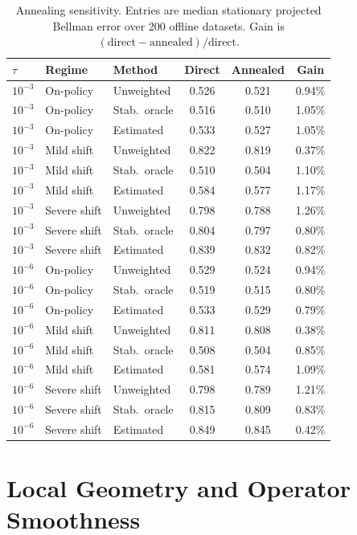 \documentclass{article}
\theoremstyle{plain}
\theoremstyle{definition}
\theoremstyle{remark}
\begin{document}
\begin{table}[h]
\centering
\caption{Annealing sensitivity. Entries are median stationary projected
Bellman error over 200 offline datasets. Gain is
\((\mathrm{direct}-\mathrm{annealed})/\mathrm{direct}\).}
\label{tab:soft-fqi-annealing-sensitivity}
\begin{tabular}{lllccc}
\toprule
\(\tau\) & Regime & Method & Direct & Annealed & Gain \\
\midrule
\(10^{-3}\) & On-policy & Unweighted & 0.526 & 0.521 & 0.94\% \\
\(10^{-3}\) & On-policy & Stab.\ oracle & 0.516 & 0.510 & 1.05\% \\
\(10^{-3}\) & On-policy & Estimated & 0.533 & 0.527 & 1.05\% \\
\(10^{-3}\) & Mild shift & Unweighted & 0.822 & 0.819 & 0.37\% \\
\(10^{-3}\) & Mild shift & Stab.\ oracle & 0.510 & 0.504 & 1.10\% \\
\(10^{-3}\) & Mild shift & Estimated & 0.584 & 0.577 & 1.17\% \\
\(10^{-3}\) & Severe shift & Unweighted & 0.798 & 0.788 & 1.26\% \\
\(10^{-3}\) & Severe shift & Stab.\ oracle & 0.804 & 0.797 & 0.80\% \\
\(10^{-3}\) & Severe shift & Estimated & 0.839 & 0.832 & 0.82\% \\
\(10^{-6}\) & On-policy & Unweighted & 0.529 & 0.524 & 0.94\% \\
\(10^{-6}\) & On-policy & Stab.\ oracle & 0.519 & 0.515 & 0.80\% \\
\(10^{-6}\) & On-policy & Estimated & 0.533 & 0.529 & 0.79\% \\
\(10^{-6}\) & Mild shift & Unweighted & 0.811 & 0.808 & 0.38\% \\
\(10^{-6}\) & Mild shift & Stab.\ oracle & 0.508 & 0.504 & 0.85\% \\
\(10^{-6}\) & Mild shift & Estimated & 0.581 & 0.574 & 1.09\% \\
\(10^{-6}\) & Severe shift & Unweighted & 0.798 & 0.789 & 1.21\% \\
\(10^{-6}\) & Severe shift & Stab.\ oracle & 0.815 & 0.809 & 0.83\% \\
\(10^{-6}\) & Severe shift & Estimated & 0.849 & 0.845 & 0.42\% \\
\bottomrule
\end{tabular}
\end{table}

\section{Local Geometry and Operator Smoothness}
\label{app:local-geometry-operator-smoothness}
\end{document}
